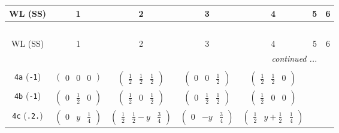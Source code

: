 \documentclass[fleqn,9pt,landscape]{jsarticle}
\begin{document}
\begin{center}
\renewcommand{\arraystretch}{1.2}
\begin{longtable}{ccccccc}
 \hline \hline
WL (SS) & 1 & 2 & 3 & 4 & 5 & 6 \\ \hline \endfirsthead

\multicolumn{6}{l}{\tablename\ \thetable{}} \\
 \hline \hline
WL (SS) & 1 & 2 & 3 & 4 & 5 & 6 \\ \hline \endhead

 \hline \hline
\multicolumn{6}{r}{\footnotesize\it continued ...} \\ \endfoot

 \hline \hline
\multicolumn{6}{r}{} \\ \endlastfoot

{\tt 4a} ({\tt -1}) & $ \begin{pmatrix} 0 & 0 & 0 \end{pmatrix} $ & $ \begin{pmatrix} \frac{1}{2} & \frac{1}{2} & \frac{1}{2} \end{pmatrix} $ & $ \begin{pmatrix} 0 & 0 & \frac{1}{2} \end{pmatrix} $ & $ \begin{pmatrix} \frac{1}{2} & \frac{1}{2} & 0 \end{pmatrix} $ & $  $ & $  $ \\ \hline
{\tt 4b} ({\tt -1}) & $ \begin{pmatrix} 0 & \frac{1}{2} & 0 \end{pmatrix} $ & $ \begin{pmatrix} \frac{1}{2} & 0 & \frac{1}{2} \end{pmatrix} $ & $ \begin{pmatrix} 0 & \frac{1}{2} & \frac{1}{2} \end{pmatrix} $ & $ \begin{pmatrix} \frac{1}{2} & 0 & 0 \end{pmatrix} $ & $  $ & $  $ \\ \hline
{\tt 4c} ({\tt .2.}) & $ \begin{pmatrix} 0 & y & \frac{1}{4} \end{pmatrix} $ & $ \begin{pmatrix} \frac{1}{2} & \frac{1}{2} - y & \frac{3}{4} \end{pmatrix} $ & $ \begin{pmatrix} 0 & - y & \frac{3}{4} \end{pmatrix} $ & $ \begin{pmatrix} \frac{1}{2} & y + \frac{1}{2} & \frac{1}{4} \end{pmatrix} $ & $  $ & $  $ \\ \hline

\end{longtable}
\end{center}
\end{document}
